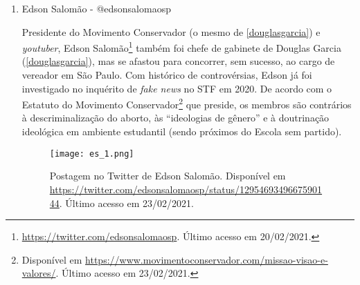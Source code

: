 \documentclass[
	12pt,				%
	openright,			%
	twoside,			%
	a4paper,			%
	english,			%
	brazil				%
	]{abntex2}
\begin{document}
\begin{anexosenv}
\begin{enumerate}
 Assim, pela crença de que a biologia é a única responsável pela diferença sexual, pela oposição ao casamento igualitário homossexual, por acreditar que qualquer orientação sexual diversa ao heterossexualismo seja incorreta, pela contrariedade às \textit{filosofias do feminismo}\footnote{Posicionamento de uma das maiores representantes da comunidade feminina da IURD e filha de Edir Macedo, Cristiane, está disponível em Souza (\citeyear{souza2017}, p. 31).}, pela ideia de que o interesse primário da mulher é o lar, que é sua responsabilidade cuidar do marido e dos filhos, e que sua vocação é a maternidade, Edir Macedo foi enquadrado, no escopo desse trabalho, no grupo antifeminista. É interessante saber, porém, que o discurso de sua igreja é considerado muitas vezes politicamente liberal em relação ao meio evangélico, e que há relações complexas em relação a mulheres autodeclaradas feministas dentro da igreja. O trabalho da pesquisadora Jacqueline Teixeira é bastante recomendado e esmiúça de maneira muito rica o assunto\footnote{Uma entrevista com ela sobre o tema pode ser encontrado em \url{https://brasil.elpais.com/brasil/2019/05/11/politica/1557527356_335349.html}. Último acesso em 23/02/2021.}.
  
 \item Edson Salomão - @edsonsalomaosp
 
 Presidente do Movimento Conservador (o mesmo de \ref{douglasgarcia}) e \textit{youtuber}, Edson Salomão\footnote{\url{https://twitter.com/edsonsalomaosp}. Último acesso em 20/02/2021.} também foi chefe de gabinete de Douglas Garcia (\ref{douglasgarcia}), mas se afastou para concorrer, sem sucesso, ao cargo de vereador em São Paulo. Com histórico de controvérsias, Edson já foi investigado no inquérito de \textit{fake news} no STF em 2020. De acordo com o Estatuto do Movimento Conservador\footnote{Disponível em \url{https://www.movimentoconservador.com/missao-visao-e-valores/}. Último acesso em 23/02/2021.} que preside, os membros são contrários à descriminalização do aborto, às ``ideologias de gênero'' e à doutrinação ideológica em ambiente estudantil (sendo próximos do Escola sem partido).
 
 \begin{figure}[!htbp]
    \centering
    \texttt{[image: es\_1.png]}
    \caption{Postagem no Twitter de Edson Salomão. Disponível em \url{https://twitter.com/edsonsalomaosp/status/1295469349667590144}. Último acesso em 23/02/2021.}
 \end{figure}
 

\end{enumerate}
\end{anexosenv}
\end{document}
